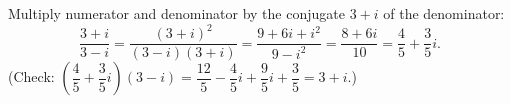 Multiply numerator and denominator by the conjugate $3+i$ of the denominator:
\[\dfrac{3+i}{3-i}=\dfrac{(3+i)^2}{(3-i)(3+i)}=\dfrac{9+6i+i^2}{9-i^2}=\dfrac{8+6i}{10}=\boxed{\dfrac{4}{5}+\dfrac{3}{5}i}.\]
(Check: $\left(\dfrac{4}{5}+\dfrac{3}{5}i\right)(3-i)=\dfrac{12}{5}-\dfrac{4}{5}i+\dfrac{9}{5}i+\dfrac{3}{5}=3+i$.)
